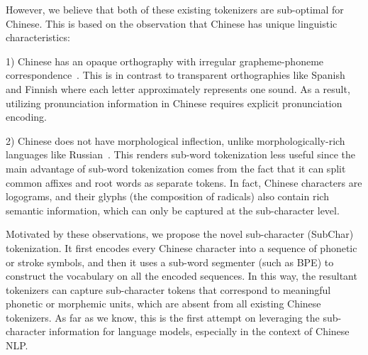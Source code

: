 
However, we believe that both of these existing tokenizers are sub-optimal for Chinese. This is based on the observation that Chinese has unique linguistic characteristics:
%

1) Chinese has an opaque orthography with irregular grapheme-phoneme correspondence~\cite{phonology_new}. This is in contrast to transparent orthographies like Spanish and Finnish where each letter approximately represents one sound.
As a result, utilizing pronunciation information in Chinese requires explicit pronunciation encoding.
%

2) Chinese does not have morphological inflection, unlike morphologically-rich languages like Russian~\cite{writing_system}. This renders sub-word tokenization less useful since the main advantage of sub-word tokenization comes from the fact that it can split common affixes and root words as separate tokens. In fact, Chinese characters are logograms, and their glyphs (the composition of radicals) also contain rich semantic information, which can only be captured at the sub-character level.


Motivated by these observations, we propose the novel sub-character (SubChar) tokenization. It first encodes every Chinese character into a sequence of phonetic or stroke symbols, and then it uses a sub-word segmenter (such as BPE) to construct the vocabulary on all the encoded sequences. 
%
In this way, the resultant tokenizers can capture sub-character tokens that correspond to meaningful phonetic or morphemic units, which are absent from all existing Chinese tokenizers. As far as we know, this is the first attempt on leveraging the sub-character information for language models, especially in the context of Chinese NLP. 



